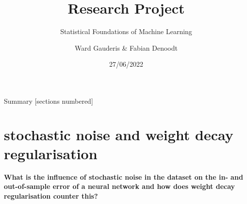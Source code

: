 \documentclass[9.5pt]{beamer}
\title{Research Project}
\subtitle{Statistical Foundations of Machine Learning}
\author{Ward Gauderis \& Fabian Denoodt}
\date{27/06/2022}
\institute{Vrije Universiteit Brussel}
\begin{document}
    \maketitle

    \begin{frame}{Summary}
        [sections numbered]
        \tableofcontents
    \end{frame}


    \section{stochastic noise and weight decay regularisation}
    \begin{frame}
        \textbf{What is the influence of stochastic noise in the dataset on the in- and out-of-sample error of a neural network and how does weight decay regularisation counter this?}
    \end{frame}
\end{document}
